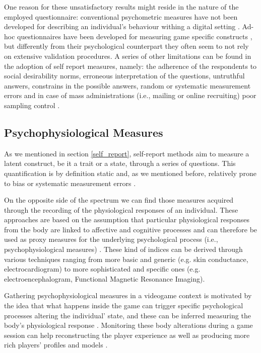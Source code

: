 One reason for these unsatisfactory results might reside in the nature of the employed questionnaire: conventional psychometric measures have not been developed for describing an individual's behaviour withing a digital setting \cite{yannakakis2013player}. Ad-hoc questionnaires have been developed for measuring game specific constructs \cite{yee2006motivations,tondello2016gamification}, but differently from their psychological counterpart they often seem to not rely on extensive validation procedures. A series of other limitations can be found in the adoption of self report measures, namely: the adherence of the respondents to social desirability norms, erroneous interpretation of the questions, untruthful answers, constrains in the possible answers, random or systematic measurement errors and in case of mass administrations (i.e., mailing or online recruiting) poor sampling control \cite{van2009psychologically}.

\subsection{Psychophysiological Measures}
\label{psychophisio} 
As we mentioned in section \ref{self_report}, self-report methods aim to measure a latent construct, be it a trait or a state, through a series of questions. This quantification is by definition static and, as we mentioned before, relatively prone to bias or systematic measurement errors \cite{van2009psychologically}. 

On the opposite side of the spectrum we can find those measures acquired through the recording of the physiological responses of an individual. These approaches are based on the assumption that particular physiological responses from the body are linked to affective and cognitive processes and can therefore be used as proxy measures for the underlying psychological process (i.e., psychophysiological measures) \cite{cacioppo2007handbook}. These kind of indices can be derived through various techniques ranging from more basic and generic (e.g. skin conductance, electrocardiogram) to more sophisticated and specific ones (e.g. electroencephalogram, Functional Magnetic Resonance Imaging). 

Gathering psychophysiological measures in a videogame context is motivated by the idea that what happens inside the game can trigger specific psychological processes altering the individual' state, and these can be inferred measuring the body’s physiological response \cite{yannakakis2013player, drachen2018games}. Monitoring these body alterations during a game session can help reconstructing the player experience \cite{mirza2013does} as well as producing more rich players’ profiles and models \cite{yannakakis2013player}. 

